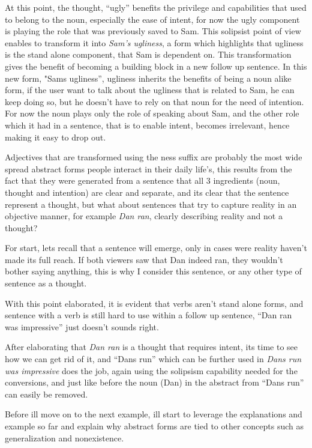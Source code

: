 \documentclass[10pt]{article}
\begin{document}
At this point, the thought, “ugly”  benefits the privilege and capabilities that used to belong to the noun, especially the ease of intent, for now the ugly component is playing the role that was previously saved to Sam. This solipsist point of view enables to transform it into \textit{Sam's ugliness}, a form which highlights that ugliness is the stand alone component, that Sam is dependent on. This transformation gives the benefit of becoming a building block in a new  follow up sentence. In this new form, "Sams ugliness”, ugliness inherits the benefits of being a noun alike form, if the user want to talk about the ugliness that is related to Sam, he can keep doing so, but he doesn't have to rely on that noun for the need of intention. For now the noun plays only the role of speaking about Sam, and the other role which it had in a sentence, that is to enable intent, becomes irrelevant, hence making it easy to drop out.\par

Adjectives that are transformed using the ness suffix are probably the most wide spread abstract forms people interact in their daily life's, this results from the fact that they were generated from a sentence that all 3 ingredients (noun, thought and intention) are clear and separate, and its clear that the sentence represent a thought, but what about sentences that try to capture reality in an objective manner, for example \textit{Dan ran}, clearly describing reality and not a thought? \par
For start, lets recall that a sentence will emerge, only in cases were reality haven't made its full reach. If both viewers saw that Dan indeed ran, they wouldn't bother saying anything, this is why I consider this sentence, or any other type of sentence as a thought. \par
With this point elaborated, it is evident that verbs aren't stand alone forms, and sentence with a verb is still hard to use within a follow up sentence,  “Dan ran was impressive” just doesn't sounds right.\par

After elaborating that \textit{Dan ran} is a thought that requires intent, its time to see how we can get rid of it, and “Dans run” which can be further used in  \textit{Dans run was impressive} does the job, again using the solipsism capability needed for the conversions, and just like before the noun (Dan)  in the abstract from “Dans run” can easily be removed.\par
Before ill move on to the next example, ill start to leverage the explanations and example so far and explain why abstract forms are tied to other concepts such as  generalization and nonexistence.\par
\end{document}
